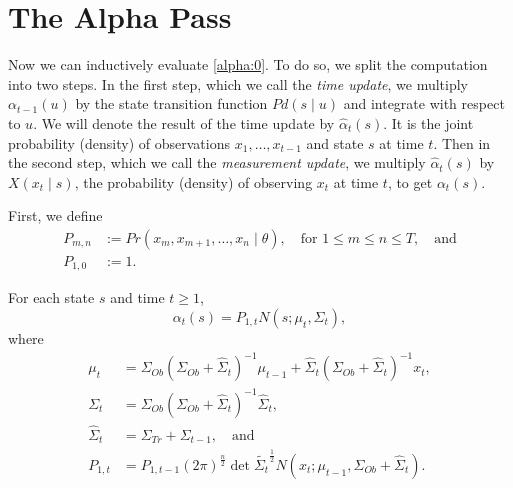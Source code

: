 \documentclass[12pt,leqno]{article}
\begin{document}
\section{The Alpha Pass}
  Now we can inductively evaluate \eqref{alpha:0}. To do so, we split the computation
  into two steps.  In the first step, which we call the {\em time update}, we multiply
  $\alpha_{t-1}(u)$ by the state transition function $Pd(s\mid u)$ and integrate with respect
  to $u$. We will denote the result of the time update by $\hat{\alpha}_t(s)$.  It is the joint probability
  (density) of observations $x_1,\dots,x_{t-1}$ and state $s$ at time $t$.
  Then in the second step, which we call the {\em measurement update}, we multiply
  $\hat{\alpha}_t(s)$ by $X(x_t \mid s)$, the probability (density) of observing $x_t$ at time $t$, to get $\alpha_t(s)$.

  First, we define
\begin{align*}
  P_{m,n} &:= Pr(x_m,x_{m+1},\dots,x_n \mid \theta),\quad\text{for $1\le m \le n\le T$},\quad\text{and}\\
  P_{1,0} &:= 1.
\end{align*}
\begin{Thm}\label{alpha:1}
  For each state $s$ and time $t \ge 1$,
$$
  \alpha_t(s) = P_{1,t}N(s;\mu_t,\Sigma_t),
$$
where
\begin{align*}
  \mu_t &= \Sigma_{Ob}(\Sigma_{Ob}+\widehat{\Sigma}_t)^{-1}\mu_{t-1}
  + \widehat{\Sigma}_t(\Sigma_{Ob}+\widehat{\Sigma}_t)^{-1}x_t, \\
  \Sigma_t &= \Sigma_{Ob}(\Sigma_{Ob}+\widehat{\Sigma}_t)^{-1}\widehat{\Sigma}_t,\\
  \widehat{\Sigma}_t &= \Sigma_{Tr}+\Sigma_{t-1},
 \quad\text{and}\\
  P_{1,t} &=P_{1,t-1}(2\pi)^{\frac{n}{2}}\det{\widetilde{\Sigma_t}}^{\frac{1}{2}}
  N(x_t;\mu_{t-1},\Sigma_{Ob} + \widehat{\Sigma}_t).
\end{align*}
\end{Thm}
\end{document}
